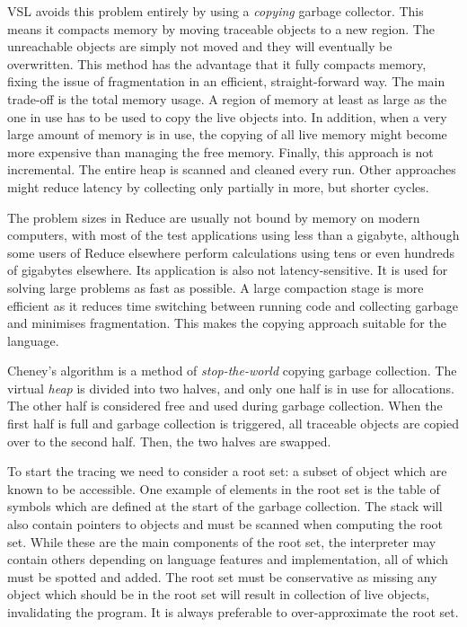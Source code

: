 VSL avoids this problem entirely by using a \emph{copying} garbage collector. This means it compacts memory by moving
traceable objects to a new region. The unreachable objects are simply not moved and they will eventually be overwritten.
This method has the advantage that it fully compacts memory, fixing the issue of fragmentation in an efficient,
straight-forward way. The main trade-off is the total memory usage. A region of memory at least
as large as the one in use has to be used to copy the live objects into. In addition, when a very large amount
of memory is in use, the copying of all live memory might become more expensive than managing the free memory.
Finally, this approach is not incremental. The entire heap is scanned and cleaned every run. Other approaches might
reduce latency by collecting only partially in more, but shorter cycles.

The problem sizes in Reduce are usually not bound by memory on modern computers, with most of the test applications
using less than a gigabyte, although some users of Reduce elsewhere perform calculations
using tens or even hundreds of gigabytes elsewhere. Its application is also not latency-sensitive. It is used for
solving large problems as fast as possible. A large compaction stage is more efficient as it reduces time
switching between running code and collecting garbage and minimises fragmentation.
This makes the copying approach suitable for the language.

Cheney's algorithm \cite{cheney} is a method of \emph{stop-the-world} copying garbage collection.
The virtual \emph{heap} is divided into
two halves, and only one half is in use for allocations. The other half is considered free and used during garbage
collection. When the first half is full and garbage collection is triggered, all traceable objects are copied over
to the second half. Then, the two halves are swapped.

To start the tracing we need to consider a root set: a subset of object which are known to be accessible.
One example of elements in the root set is the table of symbols which are defined at the start
of the garbage collection. The stack will also contain pointers to objects and must be scanned when computing the root set.
While these are the main components of the root set, the interpreter may contain others depending on language features
and implementation, all of which must be spotted and added. The root set must be conservative as missing any object which
should be in the root set will result in collection of live objects, invalidating the program. It is always
preferable to over-approximate the root set.


